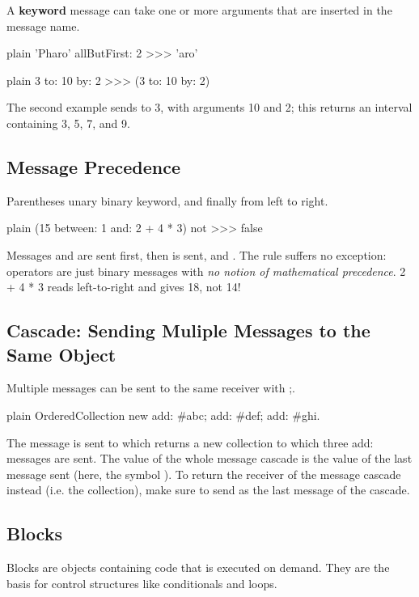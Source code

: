 \documentclass[10pt,twoside,english]{_support/latex/sbabook/sbabook}
\begin{document}
A \textbf{keyword} message can take one or more
arguments that are inserted in the message name.

\begin{displaycode}{plain}
'Pharo' allButFirst: 2
>>> 'aro'
\end{displaycode}

\begin{displaycode}{plain}
3 to: 10 by: 2
>>> (3 to: 10 by: 2)
\end{displaycode}

The second example sends
 to 3, with arguments 10 and 2; this
returns an interval containing 3, 5, 7, and 9.
\subsection{Message Precedence}
Parentheses \textcode{\textgreater{}} unary \textcode{\textgreater{}} binary \textcode{\textgreater{}} keyword, and finally from
left to right.

\begin{displaycode}{plain}
(15 between: 1 and: 2 + 4 * 3) not
>>> false
\end{displaycode}

Messages \textcode{+} and \textcode{*} are sent first, then  is sent, and .
The rule suffers no exception: operators are just binary messages with \textit{no notion of mathematical precedence}. 2 + 4 * 3 reads left-to-right and gives 18, not 14!
\subsection{Cascade: Sending Muliple Messages to the Same Object}
Multiple messages can be sent to the same receiver with ;.

\begin{displaycode}{plain}
OrderedCollection new
  add: #abc;
  add: #def;
  add: #ghi.
\end{displaycode}

The message  is sent to  which 
returns a new collection to which three
add: messages are sent. The value of the whole message cascade
is the value of the last message sent (here, the symbol
). To return the receiver of the
message cascade instead (i.e. the collection), make sure to send
 as the last message of the cascade.
\subsection{Blocks}
Blocks are objects containing code that is executed on demand. They are the basis for control structures like conditionals and loops.
\end{document}
